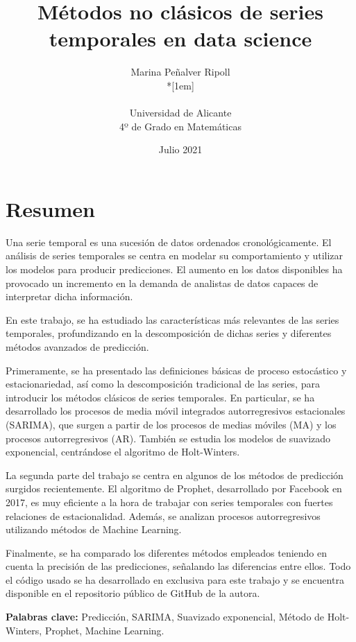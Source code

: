 \documentclass[12pt,twoside]{article}
\title{Métodos no clásicos de series temporales en data science}
\author{Marina Peñalver Ripoll\\*[1em]
\begin{minipage}{0.75\textwidth}
\footnotesize \itshape
\begin{center}
Universidad de Alicante \\
4º de Grado en Matemáticas
\end{center}
\end{minipage}
}
\date{Julio 2021}
\begin{document}









\section*{Resumen}
Una serie temporal es una sucesión de datos ordenados cronológicamente. El análisis de series temporales se centra en modelar su comportamiento y utilizar los modelos para producir predicciones.  El aumento en los datos disponibles ha provocado un incremento en la demanda de analistas de datos capaces de interpretar dicha información. 

En este trabajo, se ha estudiado las características más relevantes de las series temporales, profundizando en la descomposición de dichas series y diferentes métodos avanzados de predicción. 

Primeramente, se ha presentado las definiciones básicas de proceso estocástico y estacionariedad, así como la descomposición tradicional de las series, para introducir los métodos clásicos de series temporales. En particular, se ha desarrollado los procesos de media móvil integrados autorregresivos estacionales (SARIMA), que surgen a partir de los procesos de medias móviles (MA) y los procesos autorregresivos (AR). También se estudia los modelos de suavizado exponencial, centrándose el algoritmo de Holt-Winters. 

La segunda parte del trabajo se centra en algunos de los métodos de predicción surgidos recientemente. El algoritmo de Prophet, desarrollado por Facebook en 2017, es muy eficiente a la hora de trabajar con series temporales con fuertes relaciones de estacionalidad. Además, se analizan procesos autorregresivos utilizando métodos de Machine Learning.

Finalmente, se ha comparado los diferentes métodos empleados teniendo en cuenta la precisión de las predicciones, señalando las diferencias entre ellos. Todo el código usado se ha desarrollado en exclusiva para este trabajo y se encuentra disponible en el repositorio público de GitHub de la autora.

\textbf{Palabras clave:} Predicción, SARIMA, Suavizado exponencial, Método de Holt-Winters, Prophet, Machine Learning.
\end{document}
